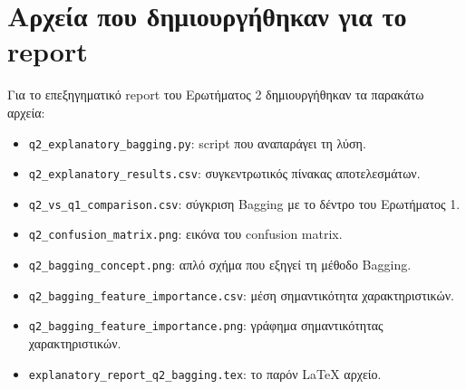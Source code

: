 \documentclass[12pt,a4paper]{article}
\newcommand{\code}[1]{\texttt{\textenglish{#1}}}
\begin{document}
\appendix
\section{Αρχεία που δημιουργήθηκαν για το report}

Για το επεξηγηματικό report του Ερωτήματος 2 δημιουργήθηκαν τα παρακάτω
αρχεία:

\begin{itemize}
    \item \code{q2\_explanatory\_bagging.py}: script που αναπαράγει τη λύση.
    \item \code{q2\_explanatory\_results.csv}: συγκεντρωτικός πίνακας
    αποτελεσμάτων.
    \item \code{q2\_vs\_q1\_comparison.csv}: σύγκριση Bagging με το δέντρο του
    Ερωτήματος 1.
    \item \code{q2\_confusion\_matrix.png}: εικόνα του confusion matrix.
    \item \code{q2\_bagging\_concept.png}: απλό σχήμα που εξηγεί τη μέθοδο
    Bagging.
    \item \code{q2\_bagging\_feature\_importance.csv}: μέση σημαντικότητα
    χαρακτηριστικών.
    \item \code{q2\_bagging\_feature\_importance.png}: γράφημα σημαντικότητας
    χαρακτηριστικών.
    \item \code{explanatory\_report\_q2\_bagging.tex}: το παρόν LaTeX αρχείο.
\end{itemize}
\end{document}
